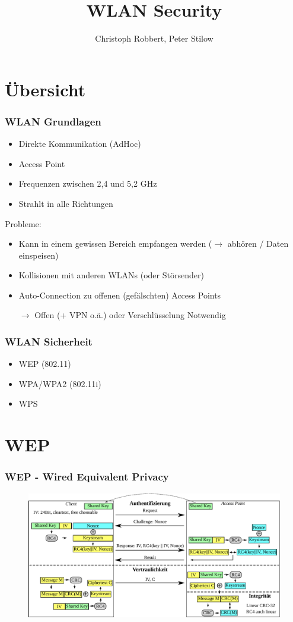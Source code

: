 \documentclass{beamer}
\author[C.Robbert, P. Stilow]{Christoph Robbert, Peter Stilow}
\institute[Uni Paderborn]{Universität Paderborn}
\title[WLAN Security]{WLAN Security}
\begin{document}
\begin{frame}
\maketitle
\end{frame}

\section{Übersicht}
\begin{frame}
\frametitle{WLAN Grundlagen}
\begin{itemize}
	\item Direkte Kommunikation (AdHoc)
	\item Access Point
	\item Frequenzen zwischen 2,4 und 5,2 GHz
	\item Strahlt in alle Richtungen
\end{itemize}
Probleme:
\begin{itemize}
	\item Kann in einem gewissen Bereich empfangen werden ($\rightarrow$ abhören / Daten einspeisen)
	\item Kollisionen mit anderen WLANs (oder Störsender)
	\item Auto-Connection zu offenen (gefälschten) Access Points
	\item[$\rightarrow$] Offen (+ VPN o.ä.) oder Verschlüsselung Notwendig
\end{itemize}
\end{frame}

\begin{frame}
\frametitle{WLAN Sicherheit}
\begin{itemize}
	\item WEP (802.11)
	\item WPA/WPA2 (802.11i)
	\item WPS
\end{itemize}
\end{frame}

\section{WEP}
\begin{frame}
\frametitle{WEP - Wired Equivalent Privacy}
\begin{figure}
	\includegraphics[width=1.0\linewidth]{figures/WEP_complete.pdf}
\end{figure}
\end{frame}
\end{document}
